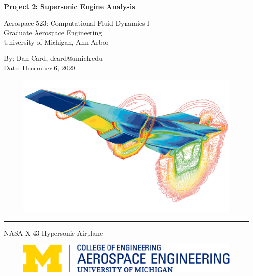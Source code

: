 \thispagestyle{empty}
\begin{center}
    \textbf{{\LARGE{\underline{Project 2: Supersonic Engine Analysis}}}}

    \vspace{0.25cm}
    Aerospace 523: Computational Fluid Dynamics I
    \\ Graduate Aerospace Engineering
    \\ University of Michigan, Ann Arbor
    
    \vspace{0.25cm}
    By: Dan Card, dcard@umich.edu
    \\ Date: December 6, 2020
\end{center}


\begin{figure}[h]
    \centering
    \includegraphics[width = \linewidth]{admin/cover.jpg}
\end{figure}
\begin{flushright}
    {\rule{2.5in}{1pt}}

    NASA X-43 Hypersonic Airplane 
\end{flushright}

\pagebreak
{
    \begin{figure}[h]
        \includegraphics[width=\linewidth]{admin/aero.jpg}
    \end{figure}

    \tableofcontents
    \pagebreak
    \listoffigures
    \listofmyequations
    \listoftables
    \lstlistoflistings
    \thispagestyle{empty}
}